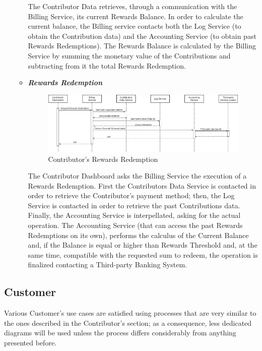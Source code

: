 \begin{itemize}
\begin{itemize}
        The Contributor Data retrieves, through a communication with the Billing Service, its current Rewards Balance. In order to calculate the current balance, the Billing service contacts both the Log Service (to obtain the Contribution data) and the Accounting Service (to obtain past Rewards Redemptions). The Rewards Balance is calculated by the Billing Service by summing the monetary value of the Contributions and subtracting from it the total Rewards Redemption. 

        \item \textbf{\textit{Rewards Redemption}}\\
        \begin{figure}[!ht]
            \centering
            \includegraphics[width=\linewidth]{document/chapters/chapter_6/images/use_cases_satisfaction_rewards_redemption.jpg}
            \caption{Contributor's Rewards Redemption}
            \label{fig:use_cases_satisfaction_rewards_redemption}
        \end{figure}

        The Contributor Dashboard asks the Billing Service the execution of a Rewards Redemption. First the Contributors Data Service is contacted in order to retrieve the Contributor's payment method; then, the Log Service is contacted in order to retrieve the past Contributions data. Finally, the Accounting Service is interpellated, asking for the actual operation. The Accounting Service (that can access the past Rewards Redemptions on its own), performs the calculus of the Current Balance and, if the Balance is equal or higher than Rewards Threshold and, at the same time, compatible with the requested sum to redeem, the operation is finalized contacting a Third-party Banking System.

    \end{itemize}
\end{itemize}

\subsection{Customer}
Various Customer's use cases are satisfied using processes that are very similar to the ones described in the Contributor's section; as a consequence, less dedicated diagrams will be used unless the process differs considerably from anything presented before.

